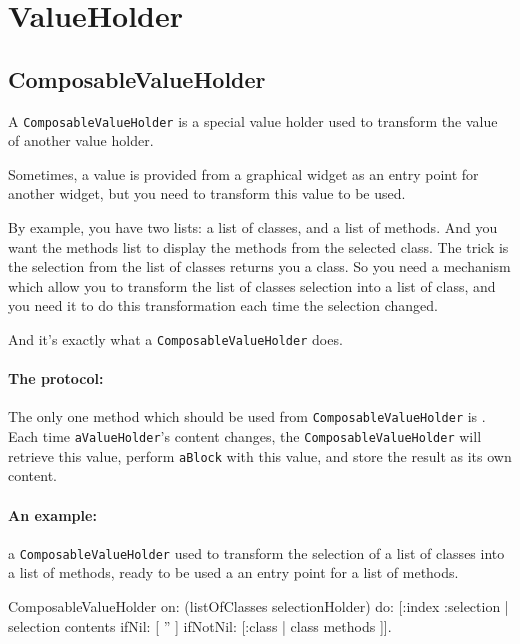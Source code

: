 \documentclass[a4paper,10pt,twoside]{book}
\begin{document}
\section{ValueHolder}


\subsection*{ComposableValueHolder} 

A \verb?ComposableValueHolder? is a special value holder used to transform the value of another value holder.

Sometimes, a value is provided from a graphical widget as an entry point for another widget, but you need to transform this value to be used.

By example, you have two lists: a list of classes, and a list of methods. And you want the methods list to display the methods from the selected class.
The trick is the selection from the list of classes returns you a class. So you need a mechanism which allow you to transform the list of classes selection into a list of class, and you need it to do this transformation each time the selection changed.

And it's exactly what a \verb?ComposableValueHolder? does.
\paragraph{The protocol: } The only one method which should be used from \verb?ComposableValueHolder? is .
Each time \verb?aValueHolder?'s content changes, the \verb?ComposableValueHolder? will retrieve this value, perform \verb?aBlock? with this value, and store the result as its own content.

\paragraph{An example: } a \verb?ComposableValueHolder? used to transform the selection of a list of classes into a list of methods, ready to be used a an entry point for a list of methods.

\begin{code}{}
ComposableValueHolder on: (listOfClasses selectionHolder) do: [:index :selection | selection contents 
		ifNil: [ '' ]
		ifNotNil: [:class | class methods ]].
\end{code}
\end{document}

